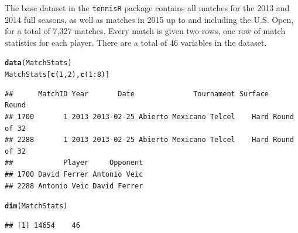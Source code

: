\documentclass{article}\usepackage[]{graphicx}\usepackage[]{color}
\makeatletter
\newcommand{\hlnum}[1]{\textcolor[rgb]{0.686,0.059,0.569}{#1}}%
\newcommand{\hlopt}[1]{\textcolor[rgb]{0,0,0}{#1}}%
\newcommand{\hlstd}[1]{\textcolor[rgb]{0.345,0.345,0.345}{#1}}%
\newcommand{\hlkwd}[1]{\textcolor[rgb]{0.737,0.353,0.396}{\textbf{#1}}}%
\newenvironment{kframe}{%
 \def\at@end@of@kframe{}%
 \ifinner\ifhmode%
  \def\at@end@of@kframe{\end{minipage}}%
  \begin{minipage}{\columnwidth}%
 \fi\fi%
 \def\FrameCommand##1{\hskip\@totalleftmargin \hskip-\fboxsep
 \colorbox{shadecolor}{##1}\hskip-\fboxsep
     \hskip-\linewidth \hskip-\@totalleftmargin \hskip\columnwidth}%
 \MakeFramed {\advance\hsize-\width
   \@totalleftmargin\z@ \linewidth\hsize
   \@setminipage}}%
 {\par\unskip\endMakeFramed%
 \at@end@of@kframe}
\newenvironment{knitrout}{}{} %
\numberwithin{equation}{section} %
\newcommand{\pkg}[1]{{\texttt{#1}}}
\makeatother
\begin{document}
The base dataset in the \pkg{tennisR} package contains all matches for the 2013 and 2014 full seasons, as well as matches in 2015 up to and including the U.S. Open, for a total of 7,327 matches.  Every match is given two rows, one row of match statistics for each player.  There are a total of 46 variables in the dataset.

\begin{knitrout}
\color{fgcolor}\begin{kframe}


{\ttfamily\noindent\itshape\color{messagecolor}{\#\# Loading required package: XML\\\#\# Loading required package: RCurl\\\#\# Loading required package: bitops\\\#\# \\\#\# Attaching package: 'plyr'\\\#\# \\\#\# The following object is masked from 'package:lubridate':\\\#\# \\\#\#\ \ \ \  here}}\end{kframe}
\end{knitrout}

\begin{knitrout}
\color{fgcolor}\begin{kframe}
\begin{alltt}
\hlkwd{data}\hlstd{(MatchStats)}
\hlstd{MatchStats[}\hlkwd{c}\hlstd{(}\hlnum{1}\hlstd{,}\hlnum{2}\hlstd{),}\hlkwd{c}\hlstd{(}\hlnum{1}\hlopt{:}\hlnum{8}\hlstd{)]}
\end{alltt}
\begin{verbatim}
##      MatchID Year       Date              Tournament Surface       Round
## 1700       1 2013 2013-02-25 Abierto Mexicano Telcel    Hard Round of 32
## 2288       1 2013 2013-02-25 Abierto Mexicano Telcel    Hard Round of 32
##            Player     Opponent
## 1700 David Ferrer Antonio Veic
## 2288 Antonio Veic David Ferrer
\end{verbatim}
\begin{alltt}
\hlkwd{dim}\hlstd{(MatchStats)}
\end{alltt}
\begin{verbatim}
## [1] 14654    46
\end{verbatim}
\end{kframe}
\end{knitrout}
\end{document}
